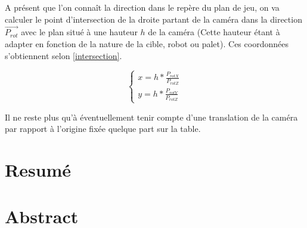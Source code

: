 \documentclass{article}
\begin{document}
\begin{appendices}
A présent que l'on connaît la direction dans le repère du plan de jeu, on va calculer le point d'intersection de la droite partant de la caméra dans la direction $\vec{P_{rot}}$ avec le plan situé à une hauteur $h$ de la caméra (Cette hauteur étant à adapter en fonction de la nature de la cible, robot ou palet). Ces coordonnées s'obtiennent selon \ref{intersection}.

\begin{equation}
\label{intersection}
\left\{
    \begin{array}{ll}
        x = h * \frac{P_{rotX}}{P_{rotZ}}\\
        y = h * \frac{P_{rotY}}{P_{rotZ}}
    \end{array}
\right.
\end{equation}

Il ne reste plus qu'à éventuellement tenir compte d'une translation de la caméra par rapport à l'origine fixée quelque part sur la table.



\end{appendices}

\newpage
\chapter{\Huge {Resumé}}

\chapter{\Huge {Abstract}}
\end{document}
